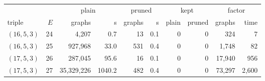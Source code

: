 \begin{tabular}{lrrrrrrrrr}
\toprule
 & & \multicolumn{2}{c}{plain} & \multicolumn{2}{c}{pruned} & \multicolumn{2}{c}{kept} & \multicolumn{2}{c}{factor} \\
triple & $E$ & graphs & s & graphs & s & plain & pruned & graphs & time \\
\midrule
$(16,5,3)$ & 24 & 4{,}207 & 0.7 & 13 & 0.1 & 0 & 0 & 324 & 7 \\
$(16,5,3)$ & 25 & 927{,}968 & 33.0 & 531 & 0.4 & 0 & 0 & 1{,}748 & 82 \\
$(17,5,3)$ & 26 & 287{,}045 & 95.6 & 16 & 0.1 & 0 & 0 & 17{,}940 & 956 \\
$(17,5,3)$ & 27 & 35{,}329{,}226 & 1040.2 & 482 & 0.4 & 0 & 0 & 73{,}297 & 2{,}600 \\
\bottomrule
\end{tabular}
